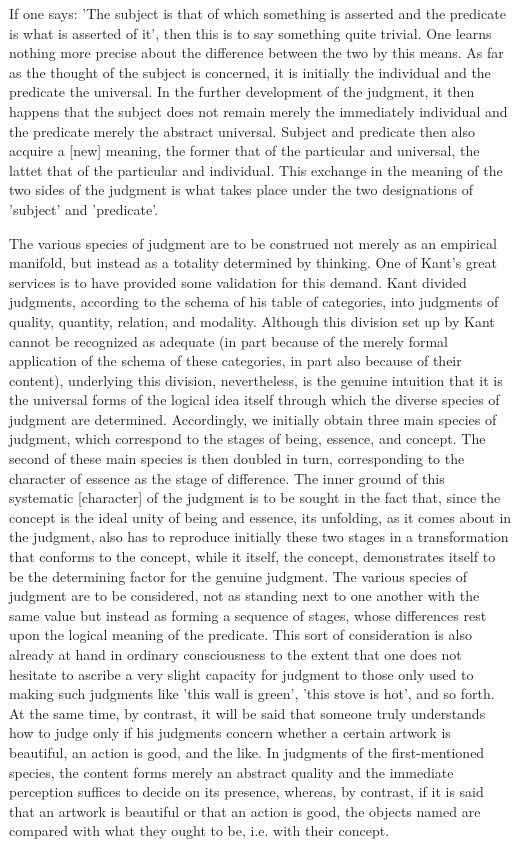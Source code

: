 If one says: 'The subject is that of which something is asserted and the
predicate is what is asserted of it', then this is to say something quite trivial.
One learns nothing more precise about the difference between the two by this means.
As far as the thought of the subject is concerned, it is initially the individual and
the predicate the universal. In the further development of the judgment, it then
happens that the subject does not remain merely the immediately individual and
the predicate merely the abstract universal. Subject and predicate then also acquire
a [new] meaning, the former that of the particular and universal, the lattet that
of the particular and individual. This exchange in the meaning of the two sides
of the judgment is what takes place under the two designations of 'subject' and
'predicate'.

The various species of judgment are to be
construed not merely as an empirical manifold,
but instead as a totality determined by thinking.
One of Kant's great services is to have provided some validation for this demand.
Kant divided judgments, according to the schema of his table of categories,
into judgments of quality, quantity, relation, and modality.
Although this division set up by Kant cannot be recognized as adequate
(in part because of the merely formal application of the schema of these categories,
in part also because of their content),
underlying this division, nevertheless, is the genuine intuition that
it is the universal forms of the logical idea itself
through which the diverse species of judgment are determined.
Accordingly, we initially obtain three main species of judgment,
which correspond to the stages of being, essence, and concept.
The second of these main species is then doubled in turn,
corresponding to the character of essence as the stage of difference.
The inner ground of this systematic [character] of
the judgment is to be sought in the fact that,
since the concept is the ideal unity of being and essence,
its unfolding, as it comes about in the judgment, also
has to reproduce initially these two stages in a transformation that
conforms to the concept, while it itself, the concept,
demonstrates itself to be the determining factor for the genuine judgment.
The various species of judgment are to be considered,
not as standing next to one another with the same value but
instead as forming a sequence of stages, whose differences
rest upon the logical meaning of the predicate.
This sort of consideration is also already at hand in
ordinary consciousness to the extent that one does not hesitate to ascribe a very
slight capacity for judgment to those only used to making such judgments like
'this wall is green', 'this stove is hot', and so forth.
At the same time, by contrast, it will be said that someone truly understands
how to judge only if his judgments concern whether a certain artwork is beautiful,
an action is good, and the like.
In judgments of the first-mentioned species, the content forms merely an abstract
quality and the immediate perception suffices to decide on its presence, whereas,
by contrast, if it is said that an artwork is beautiful or that an action is good,
the objects named are compared with what they ought to be, i.e. with their concept.

